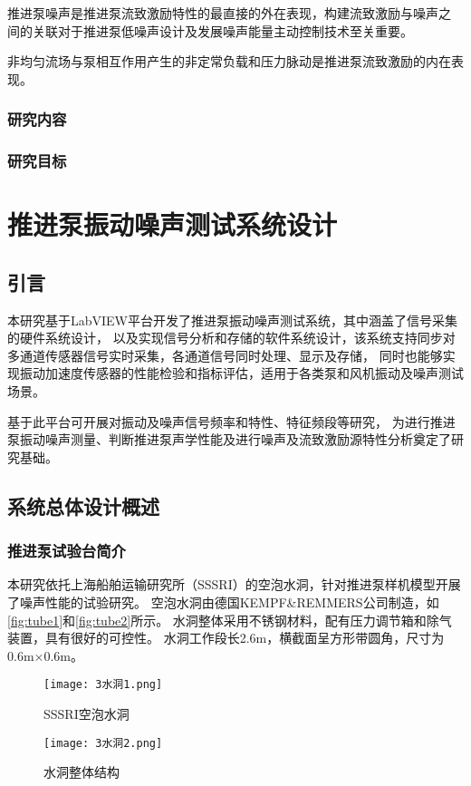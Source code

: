 推进泵噪声是推进泵流致激励特性的最直接的外在表现，构建流致激励与噪声之
间的关联对于推进泵低噪声设计及发展噪声能量主动控制技术至关重要。

非均匀流场与泵相互作用产生的非定常负载和压力脉动是推进泵流致激励的内在表现。


\subsection{研究内容}
\subsection{研究目标}

\chapter{推进泵振动噪声测试系统设计}
\section{引言}
本研究基于LabVIEW平台开发了推进泵振动噪声测试系统，其中涵盖了信号采集的硬件系统设计，
以及实现信号分析和存储的软件系统设计，该系统支持同步对多通道传感器信号实时采集，各通道信号同时处理、显示及存储，
同时也能够实现振动加速度传感器的性能检验和指标评估，适用于各类泵和风机振动及噪声测试场景。

基于此平台可开展对振动及噪声信号频率和特性、特征频段等研究，
为进行推进泵振动噪声测量、判断推进泵声学性能及进行噪声及流致激励源特性分析奠定了研究基础。

\section{系统总体设计概述}
\subsection{推进泵试验台简介}
本研究依托上海船舶运输研究所（SSSRI）的空泡水洞，针对推进泵样机模型开展了噪声性能的试验研究。
空泡水洞由德国KEMPF\&REMMERS公司制造，如\autoref{fig:tube1}和\autoref{fig:tube2}所示。
水洞整体采用不锈钢材料，配有压力调节箱和除气装置，具有很好的可控性。
水洞工作段长2.6m，横截面呈方形带圆角，尺寸为0.6m×0.6m。
\begin{figure}[htbp]
    \centering
    \texttt{[image: 3水洞1.png]}
    \caption{\label{fig:tube1}SSSRI空泡水洞}
\end{figure}
\begin{figure}[htbp]
    \centering
    \texttt{[image: 3水洞2.png]}
    \caption{\label{fig:tube2}水洞整体结构}
\end{figure}

